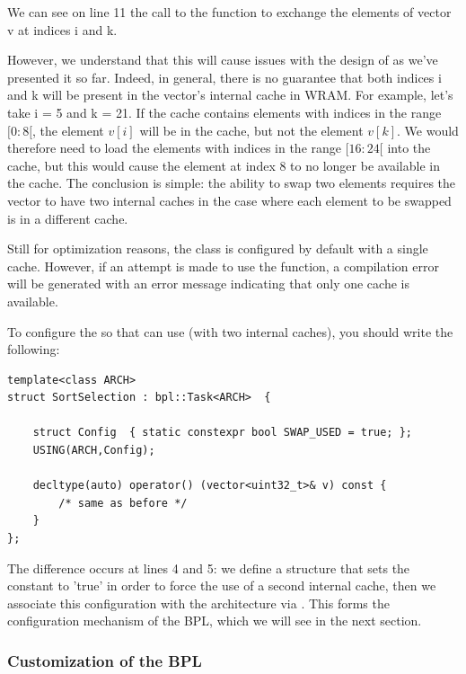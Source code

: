 We can see on line 11 the call to the  function to exchange the elements of vector v at indices i and k.

However, we understand that this will cause issues with the design of  as we've presented it so far.  Indeed, in general, there is no guarantee that both indices i and k will be present in the vector's internal cache in WRAM.  For example, let's take i = 5 and k = 21. If the cache contains elements with indices in the range $[0:8[$,  the element $v[i]$ will be in the cache, but not the element $v[k]$. We would therefore need to load the elements with indices in the range $[16:24[$ into the cache, but this would cause the element at index $8$ to no longer be  available in the cache. The conclusion is simple: the ability to swap two elements requires the vector to have 
two internal caches in the case where each element to be swapped is in a different cache.

Still for optimization reasons, the  class is configured by default with a single cache. However, if an attempt is made to use the  function, a compilation error will be generated with an error message indicating that only one cache is available.  

To configure the \BPL so that  can use  (with two internal caches), you should write the following:

\begin{verbatim}
template<class ARCH>
struct SortSelection : bpl::Task<ARCH>  {
	
    struct Config  { static constexpr bool SWAP_USED = true; };
    USING(ARCH,Config);

    decltype(auto) operator() (vector<uint32_t>& v) const { 
        /* same as before */
    }
};
\end{verbatim}

The difference occurs at lines 4 and 5: we define a  structure that sets the constant  to 'true' in order to force the use of a second internal cache, then we associate this configuration with the architecture via . This forms the configuration mechanism of the BPL, which we will see in the next section.

\subsubsection{Customization of the BPL}

